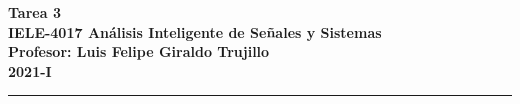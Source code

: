 \documentclass[11pt,spanish]{article}
\begin{document}
\thispagestyle{empty}


\begin{flushleft}
\bf\large Tarea 3\\
\bf\large IELE-4017  Análisis Inteligente de Señales y Sistemas \\
\bf\large Profesor: Luis Felipe Giraldo Trujillo\\
\bf\large 2021-I
\end{flushleft}



\noindent


\noindent
\rule{\textwidth}{1pt}

\medskip

\end{document}
